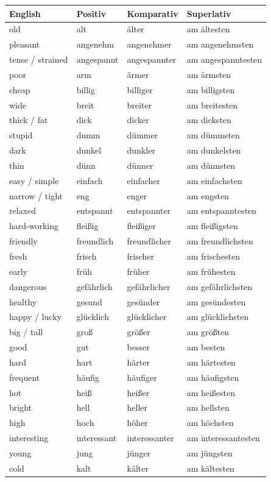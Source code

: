 \noindent
\begin{minipage}[t]{0.49\textwidth}
\vspace{0pt}
\footnotesize
\setlength{\tabcolsep}{2pt}
\renewcommand{\arraystretch}{1.12}
\begin{tabularx}{\linewidth}{@{}lllX@{}}
\toprule
English & Positiv & Komparativ & Superlativ \\
\midrule
old & alt & älter & am ältesten \\
pleasant & angenehm & angenehmer & am angenehmsten \\
tense / strained & angespannt & angespannter & am angespanntesten \\
poor & arm & ärmer & am ärmsten \\
cheap & billig & billiger & am billigsten \\
wide & breit & breiter & am breitesten \\
thick / fat & dick & dicker & am dicksten \\
stupid & dumm & dümmer & am dümmsten \\
dark & dunkel & dunkler & am dunkelsten \\
thin & dünn & dünner & am dünnsten \\
easy / simple & einfach & einfacher & am einfachsten \\
narrow / tight & eng & enger & am engsten \\
relaxed & entspannt & entspannter & am entspanntesten \\
hard-working & fleißig & fleißiger & am fleißigsten \\
friendly & freundlich & freundlicher & am freundlichsten \\
fresh & frisch & frischer & am frischesten \\
early & früh & früher & am frühesten \\
dangerous & gefährlich & gefährlicher & am gefährlichsten \\
healthy & gesund & gesünder & am gesündesten \\
happy / lucky & glücklich & glücklicher & am glücklichsten \\
big / tall & groß & größer & am größten \\
good & gut & besser & am besten \\
hard & hart & härter & am härtesten \\
frequent & häufig & häufiger & am häufigsten \\
hot & heiß & heißer & am heißesten \\
bright & hell & heller & am hellsten \\
high & hoch & höher & am höchsten \\
interesting & interessant & interessanter & am interessantesten \\
young & jung & jünger & am jüngsten \\
cold & kalt & kälter & am kältesten \\
\bottomrule
\end{tabularx}
\end{minipage}%
